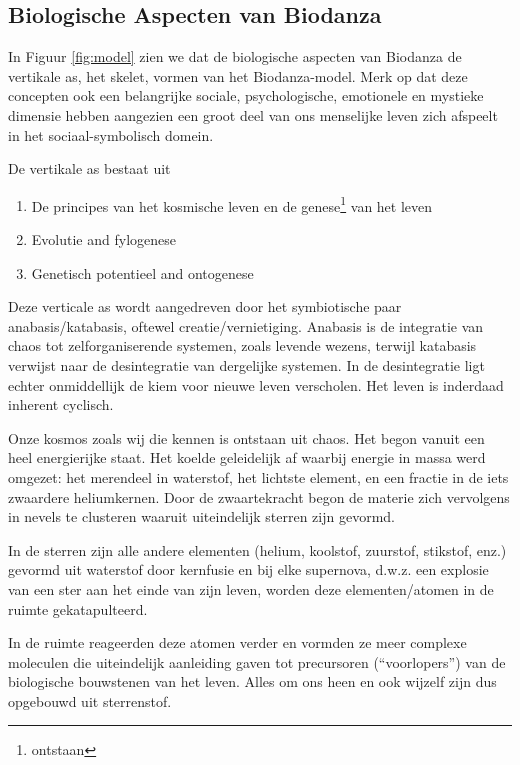 \documentclass[
  11pt,
]{book}
\providecommand{\tightlist}{%
  \setlength{\itemsep}{0pt}\setlength{\parskip}{0pt}}
\begin{document}
\hypertarget{biologische-aspecten-van-biodanza}{%
\subsection{Biologische Aspecten van Biodanza}\label{biologische-aspecten-van-biodanza}}

In Figuur \ref{fig:model} zien we dat de biologische aspecten van Biodanza de vertikale as, het skelet, vormen van het Biodanza-model. Merk op dat deze concepten ook een belangrijke sociale, psychologische, emotionele en mystieke dimensie hebben aangezien een groot deel van ons menselijke leven zich afspeelt in het sociaal-symbolisch domein.

De vertikale as bestaat uit

\begin{enumerate}
\def\labelenumi{\arabic{enumi}.}
\tightlist
\item
  De principes van het kosmische leven en de genese\footnote{ontstaan} van het leven
\item
  Evolutie and fylogenese
\item
  Genetisch potentieel and ontogenese
\end{enumerate}

Deze verticale as wordt aangedreven door het symbiotische paar anabasis/katabasis, oftewel creatie/vernietiging. Anabasis is de integratie van chaos tot zelforganiserende systemen, zoals levende wezens, terwijl katabasis verwijst naar de desintegratie van dergelijke systemen. In de desintegratie ligt echter onmiddellijk de kiem voor nieuwe leven verscholen. Het leven is inderdaad inherent cyclisch.

Onze kosmos zoals wij die kennen is ontstaan uit chaos. Het begon vanuit een heel energierijke staat. Het koelde geleidelijk af waarbij energie in massa werd omgezet: het merendeel in waterstof, het lichtste element, en een fractie in de iets zwaardere heliumkernen. Door de zwaartekracht begon de materie zich vervolgens in nevels te clusteren waaruit uiteindelijk sterren zijn gevormd.

In de sterren zijn alle andere elementen (helium, koolstof, zuurstof, stikstof, enz.) gevormd uit waterstof door kernfusie en bij elke supernova, d.w.z. een explosie van een ster aan het einde van zijn leven, worden deze elementen/atomen in de ruimte gekatapulteerd.

In de ruimte reageerden deze atomen verder en vormden ze meer complexe moleculen die uiteindelijk aanleiding gaven tot precursoren (``voorlopers'') van de biologische bouwstenen van het leven. Alles om ons heen en ook wijzelf zijn dus opgebouwd uit sterrenstof.
\end{document}
